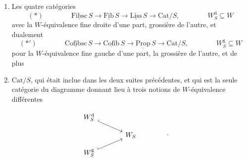 \documentclass[11pt]{article}
\newcommand{\printedpage}[1]{\marginpar{\footnotesize p.~#1}}
\newcommand{\ul}[1]{\underline{\mathrm{#1}}}
\begin{document}
\begin{enumerate}[label={}]
\item[$1^{o}$)] Les quatre catégories
\[(*) \qquad\qquad \ul{Fibsc}\,S \longrightarrow \ul{Fib}\,S \longrightarrow \ul{Liss}\,S \longrightarrow \mathrm{Cat}/S, \qquad\qquad W_S^{\mathrm{d}} \subseteq W\]
avec la $W$-équivalence fine droite d'une part, grossière de l'autre, et dualement
\[(*') \qquad\qquad \ul{Cofibsc}\,S \longrightarrow \ul{Cofib}\,S \longrightarrow \ul{Prop}\,S \longrightarrow \mathrm{Cat}/S, \qquad\qquad W_S^{\mathrm{g}} \subseteq W\]
pour la $W$-équivalence fine gauche d'une part, la grossière de l'autre, et de plus
\item[$2^{o}$)] $\mathrm{Cat}/S$, qui était inclue dans les deux suites précédentes, et qui est la seule catégorie du diagramme donnant lieu à trois notions de $W$-équivalence différentes %
\end{enumerate}

\[
\begin{tikzcd}[row sep=small, column sep=large]
W_S^{\mathrm{d}} \arrow[dr, hook] & \\
& W_S \\
W_S^{\mathrm{g}} \arrow[ur, hook] &
\end{tikzcd}
\qquad\qquad .
\]

\printedpage{38}
\end{document}
